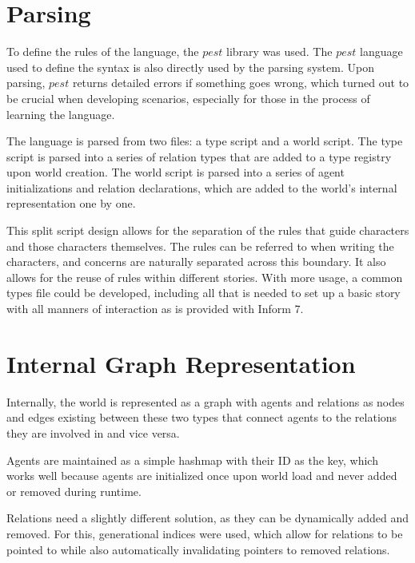 \section{Parsing} \label{sec:Parsing}

To define the rules of the language, the $pest$ library was used. The $pest$
language used to define the syntax is also directly used by the parsing system.
Upon parsing, $pest$ returns detailed errors if something goes wrong, which
turned out to be crucial when developing scenarios, especially for those in the
process of learning the language.

The language is parsed from two files: a type script and a world script. The type
script is parsed into a series of relation types that are added to a type registry
upon world creation. The world script is parsed into a series of agent initializations
and relation declarations, which are added to the world's internal representation
one by one.

This split script design allows for the separation of the rules that guide characters
and those characters themselves. The rules can be referred to when writing the
characters, and concerns are naturally separated across this boundary. It also
allows for the reuse of rules within different stories. With more usage, a common
types file could be developed, including all that is needed to set up a basic
story with all manners of interaction as is provided with Inform 7. \cite{inform_7_inform_nodate}

\section{Internal Graph Representation} \label{sec:InternalGraphRepresentation}

Internally, the world is represented as a graph with agents and relations as nodes
and edges existing between these two types that connect agents to the relations they
are involved in and vice versa.

Agents are maintained as a simple hashmap with their ID as the key, which works
well because agents are initialized once upon world load and never added or removed
during runtime.

Relations need a slightly different solution, as they can be dynamically added and
removed. For this, generational indices were used, which allow for relations to be
pointed to while also automatically invalidating pointers to removed relations. \cite{weissflog_handles_2018}

